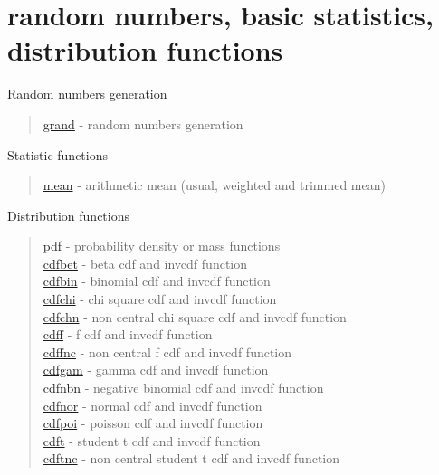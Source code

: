 \chapter*{random numbers, basic statistics, distribution functions}

Random numbers generation

\begin{quote}
\noindent
\hyperlink{grand}{grand} - random numbers generation
\end{quote}

Statistic functions

\begin{quote}
\noindent
\hyperlink{mean}{mean} - arithmetic mean (usual, weighted and trimmed mean)\\
\end{quote}



Distribution functions

\begin{quote}
\noindent
\hyperlink{pdf}{pdf} - probability density or mass functions \\
\hyperlink{cdfbet}{cdfbet} - beta cdf and invcdf function \\
\hyperlink{cdfbin}{cdfbin} - binomial cdf and invcdf function \\
\hyperlink{cdfchi}{cdfchi} - chi square cdf and invcdf function \\
\hyperlink{cdfchn}{cdfchn} - non central chi square cdf and invcdf function \\
\hyperlink{cdff}{cdff} - f cdf and invcdf function \\
\hyperlink{cdffnc}{cdffnc} - non central f cdf and invcdf function \\
\hyperlink{cdfgam}{cdfgam} - gamma cdf and invcdf function \\
\hyperlink{cdfnbn}{cdfnbn} - negative binomial cdf and invcdf function \\
\hyperlink{cdfnor}{cdfnor} - normal cdf and invcdf function \\
\hyperlink{cdfpoi}{cdfpoi} - poisson cdf and invcdf function \\
\hyperlink{cdft}{cdft} - student t cdf and invcdf function \\
\hyperlink{cdftnc}{cdftnc} - non central student t cdf and invcdf function \\
\end{quote}


 

 

 













